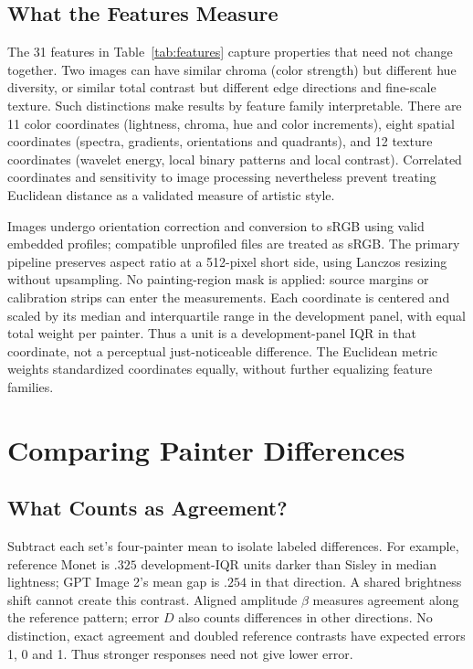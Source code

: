 \subsection{What the Features Measure}\label{sec:features}
The 31 features in Table~\ref{tab:features} capture properties that need not
change together. Two images can have similar chroma (color strength) but different
hue diversity, or similar total contrast but different edge directions and
fine-scale texture. Such distinctions make results by feature family interpretable.
There are 11 color coordinates (lightness, chroma, hue and color increments),
eight spatial coordinates (spectra, gradients, orientations and quadrants),
and 12 texture coordinates (wavelet energy, local binary patterns and local contrast).
Correlated coordinates and sensitivity to image processing nevertheless prevent
treating Euclidean distance as a validated measure of artistic style.



Images undergo orientation correction and conversion to sRGB using valid
embedded profiles; compatible unprofiled files are treated as sRGB. The primary
pipeline preserves aspect ratio at a 512-pixel short side, using Lanczos resizing
without upsampling. No painting-region mask is applied: source margins or
calibration strips can enter the measurements. Each coordinate is centered and scaled by its
median and interquartile range in the development panel, with equal total
weight per painter. Thus a unit is a development-panel IQR in that coordinate,
not a perceptual just-noticeable difference. The Euclidean metric weights
standardized coordinates equally, without further equalizing feature families.



\section{Comparing Painter Differences}\label{sec:method}
\subsection{What Counts as Agreement?}\label{sec:contrast-intuition}
Subtract each set's four-painter mean to isolate labeled differences. For
example, reference Monet is $.325$ development-IQR units darker than Sisley
in median lightness; GPT Image 2's mean gap is $.254$ in that direction.
A shared brightness shift cannot create this contrast.
Aligned amplitude $\beta$ measures agreement along the reference pattern;
error $D$ also counts differences in other directions. No distinction, exact
agreement and doubled reference contrasts have expected errors 1, 0 and 1.
Thus stronger responses need not give lower error.

